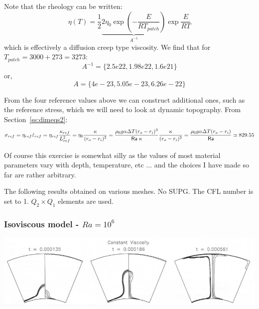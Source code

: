 Note that the rheology can be written:
\[
\eta(T)  
= \frac12 \underbrace{2 \eta_0  \exp\left( -\frac{E}{R T_{patch}} \right) }_{A^{-1}} \exp \frac{E}{R T}  
\]
which is effectively a diffusion creep type viscosity.
We find that for $T_{patch}=3000+273=3273$: 
\[
A^{-1} = \{ 2.5e22, 1.98e22 , 1.6e21 \}
\]
or, 
\[
A = \{ 4e-23    , 5.05e-23   ,  6.26e-22\} 
\]


From the four reference values above we can construct additional ones, 
such as the reference stress, which we will need to look at dynamic topography.
From Section~\ref{ss:dimeqs2}:
\[
\sigma_{ref} 
= \eta_{ref} \dot{\varepsilon}_{ref} 
= \eta_{ref} \frac{\kappa_{ref}}{L^2_{ref}} 
= \eta_0 \frac{\kappa }{ (r_o-r_i)^2}
= \frac{\rho_0 g \alpha \Delta T (r_o-r_i)^3}{{\mathsf{Ra}} \; \kappa} \frac{\kappa}{(r_o-r_i)^2}
= \frac{\rho_0 g \alpha \Delta T (r_o-r_i)}{{\mathsf{Ra}}}
\simeq 829.55  
\] 




Of course this exercise is somewhat silly as the values of most material parameters
vary with depth, temperature, etc ... and the choices I have made so far are rather arbitrary.

The following results obtained on various meshes. 
No SUPG. The CFL number is set to 1. 
$Q_2\times Q_1$ elements are used. 

\newpage
\subsubsection*{Isoviscous model - $Ra=10^6$}

\begin{center}
\includegraphics[width=15cm]{python_codes/fieldstone_106/images/keki97b}
\end{center}


